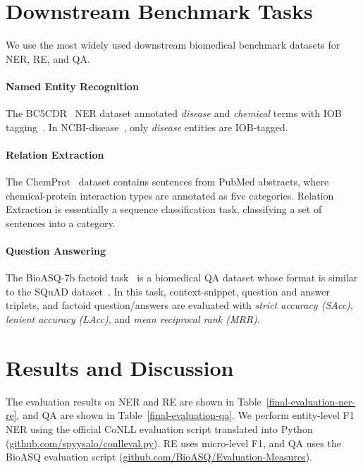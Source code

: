 \documentclass[11pt,a4paper]{article}
\begin{document}
\section{Downstream Benchmark Tasks}

We use the most widely used downstream biomedical benchmark datasets for NER, RE, and QA.

\paragraph{Named Entity Recognition}

The BC5CDR~\citep{li2016biocreative} NER dataset annotated \textit{disease} and \textit{chemical} terms with IOB tagging~\citep{ramshaw1999text}.
In NCBI-disease~\citep{dougan2014ncbi}, only \textit{disease} entities are IOB-tagged.

\paragraph{Relation Extraction}

The ChemProt~\citep{krallinger2015chemdner} dataset contains sentences from PubMed abstracts, where chemical-protein interaction types are annotated as five categories. Relation Extraction is essentially a sequence classification task, classifying a set of sentences into a category.


\paragraph{Question Answering}

The BioASQ-7b factoid task~\citep{tsatsaronis2015overview} is a biomedical QA dataset whose format is similar to the SQuAD dataset~\citep{rajpurkar2016squad}.
In this task, context-snippet, question and answer triplets, and factoid question/answers are evaluated with \textit{strict accuracy (SAcc)}, \textit{lenient accuracy (LAcc)}, and \textit{mean reciprocal rank (MRR)}.


\section{Results and Discussion}

The evaluation results on NER and RE are shown in Table~\ref{final-evaluation-ner-re}, and QA are shown in Table~\ref{final-evaluation-qa}.
We perform entity-level F1 NER using the official CoNLL evaluation script translated into Python (\url{github.com/spyysalo/conlleval.py}). RE uses micro-level F1, and QA uses the BioASQ evaluation script (\url{github.com/BioASQ/Evaluation-Measures}).
\end{document}
